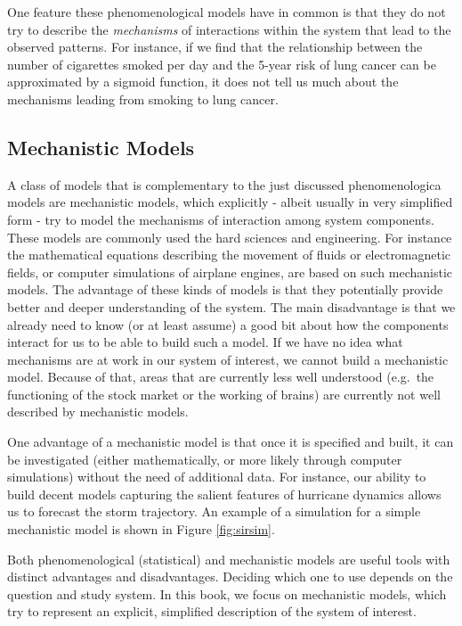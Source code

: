 \documentclass[]{book}
\theoremstyle{definition}
\theoremstyle{definition}
\theoremstyle{definition}
\theoremstyle{remark}
\begin{document}
One feature these phenomenological models have in common is that they do
not try to describe the \emph{mechanisms} of interactions within the
system that lead to the observed patterns. For instance, if we find that
the relationship between the number of cigarettes smoked per day and the
5-year risk of lung cancer can be approximated by a sigmoid function, it
does not tell us much about the mechanisms leading from smoking to lung
cancer.

\subsection{Mechanistic Models}\label{mechanistic-models}

A class of models that is complementary to the just discussed
phenomenologica models are mechanistic models, which explicitly - albeit
usually in very simplified form - try to model the mechanisms of
interaction among system components. These models are commonly used the
hard sciences and engineering. For instance the mathematical equations
describing the movement of fluids or electromagnetic fields, or computer
simulations of airplane engines, are based on such mechanistic models.
The advantage of these kinds of models is that they potentially provide
better and deeper understanding of the system. The main disadvantage is
that we already need to know (or at least assume) a good bit about how
the components interact for us to be able to build such a model. If we
have no idea what mechanisms are at work in our system of interest, we
cannot build a mechanistic model. Because of that, areas that are
currently less well understood (e.g.~the functioning of the stock market
or the working of brains) are currently not well described by
mechanistic models.

One advantage of a mechanistic model is that once it is specified and
built, it can be investigated (either mathematically, or more likely
through computer simulations) without the need of additional data. For
instance, our ability to build decent models capturing the salient
features of hurricane dynamics allows us to forecast the storm
trajectory. An example of a simulation for a simple mechanistic model is
shown in Figure \ref{fig:sirsim}.

Both phenomenological (statistical) and mechanistic models are useful
tools with distinct advantages and disadvantages. Deciding which one to
use depends on the question and study system. In this book, we focus on
mechanistic models, which try to represent an explicit, simplified
description of the system of interest.
\end{document}
